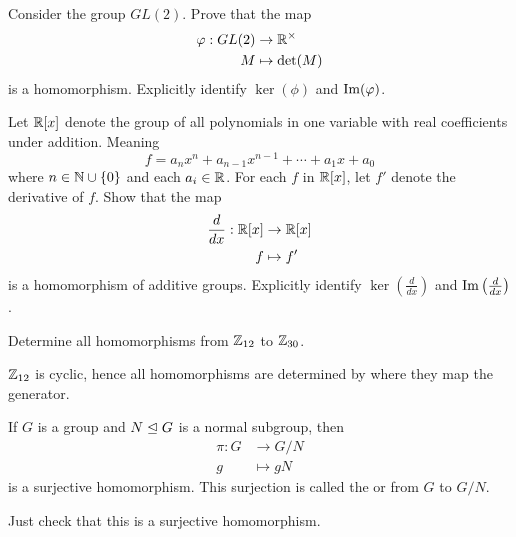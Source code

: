 \documentclass{ximera}
\begin{document}
\begin{exercise}
  Consider the group $GL(2)$. Prove that the map
  \begin{align*}
    \varphi:GL(2) &\to \mathbb R^\times\\
    M &\mapsto \det(M)
  \end{align*}
  is a homomorphism. Explicitly identify $\ker(\phi)$ and
  $\operatorname{Im}(\varphi)$.
\end{exercise}



\begin{exercise}
  Let $\mathbb R[x]$ denote the group of all polynomials in one variable with
  real coefficients under addition. Meaning
  \[
  f = a_n x^{n} + a_{n-1}x^{n-1} + \cdots + a_1x + a_0
  \]
  where $n\in\mathbb N\cup\{0\}$ and each $a_i\in\mathbb R$.  For each $f$ in $\mathbb R[x]$,
  let $f'$ denote the derivative of $f$. Show that the map
  \begin{align*}
    \frac{d}{dx}:\mathbb R[x]&\to\mathbb R[x]\\
    f  &\mapsto f'
  \end{align*}
  is a homomorphism of additive groups. Explicitly identify
  $\ker\left(\frac{d}{dx}\right)$ and $\operatorname{Im}\left(\frac{d}{dx}\right)$.
\end{exercise}



\begin{exercise}
  Determine all homomorphisms from $\mathbb Z_{12}$ to $\mathbb Z_{30}$.
  \begin{hint}
    $\mathbb Z_{12}$ is cyclic, hence all homomorphisms are determined by
    where they map the generator.
  \end{hint}
\end{exercise}



\begin{theorem}
  If $G$ is a group and $N\trianglelefteq G$ is a normal subgroup, then
  \begin{align*}
  \pi:G &\to G/N\\
  g &\mapsto gN
  \end{align*}
  is a surjective homomorphism. This surjection is called the
   or  from $G$ to
  $G/N$.
  \begin{sketch}
    Just check that this is a surjective homomorphism.
  \end{sketch}
\end{theorem}
\end{document}
